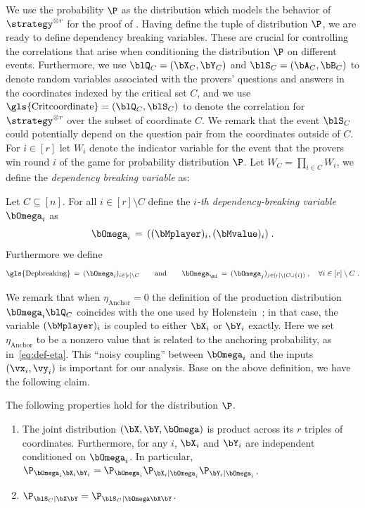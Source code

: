 We use the probability $\P$ as the distribution which models the behavior of $\strategy^{\otimes r}$ for the proof of . Having define the tuple of distribution $\P$, we are ready to define dependency breaking variables. These are crucial for controlling the correlations that arise when conditioning the distribution $\P$ on different events. Furthermore, we use $\blQ_C = (\bX_C,\bY_C)$ and $\blS_C = (\bA_C,\bB_C)$ to denote random variables associated with the provers' questions and answers in the coordinates indexed by the critical set $C$, and we use $\text{\gls{Critcoordinate}}=(\blQ_C, \blS_C)$ to denote the correlation for $\strategy^{\otimes r}$ over the subset of coordinate $C$. We remark that the event $\blS_C$ could potentially depend on the question pair from the coordinates outside of $C$. For $i \in [r]$ let $W_i$ denote the indicator variable for the event that the provers win round $i$ of the game for probability distribution $\P$. Let $W_C = \prod_{i \in C} W_i$, we define the \textit{dependency breaking variable} as:

\begin{definition} \label{def:Depbreaking}
	Let $C \subseteq [n]$. For all $i \in [r] \setminus C$ define the \emph{$i$-th dependency-breaking variable $\bOmega_i$} as 
	\[\bOmega_i \,=\, ((\bMplayer)_i,(\bMvalue)_i)\;.\]
	Furthermore we define 
	\begin{equation}
	 \text{\gls{Depbreaking}} \,=\, (\bOmega_i)_{i \in [r] \setminus C}\qquad \text{and}\qquad \bOmega_\mi\,=\,(\bOmega_j)_{j \in [r] \setminus (C \cup \{i\})} \;,\quad \forall i \in [r] \setminus C\;.
	\end{equation}
\end{definition}

We remark that when $\eta_{\text{Anchor}} = 0$ the definition of the production distribution $\bOmega_i \blQ_C$ coincides with the one used by Holenstein~\cite{holensteinParallelRepetitionSimplifications2009}; in that case, the variable $(\bMplayer)_i$ is coupled to either $\bX_i$ or $\bY_i$ exactly. Here we set $\eta_{\text{Anchor}}$ to be a nonzero value that is related to the anchoring probability, as in~\eqref{eq:def-eta}. This ``noisy coupling'' between $\bOmega_i$ and the inputs $(\vx_i,\vy_i)$ is important for our analysis. Base on the above definition, we have the following claim. 

\begin{claim}\label{claim:ufacts}
	The following properties hold for the distribution $\P$.
	\begin{enumerate}
		\item The joint distribution $(\bX,\bY,\bOmega)$ is product across its $r$ triples of coordinates. Furthermore, for any $i$, $\bX_i$ and $\bY_i$ are independent conditioned on $\bOmega_i$. In particular,
		$\P_{\bOmega_i \bX_i \bY_i} =\P_{\bOmega_i} \P_{\bX_i | \bOmega_i} \P_{\bY_i | \bOmega_i}$. 
		\item $\P_{\blS_C | \bX \bY} = \P_{\blS_C | \bOmega \bX \bY}$.
	\end{enumerate}
\end{claim}

